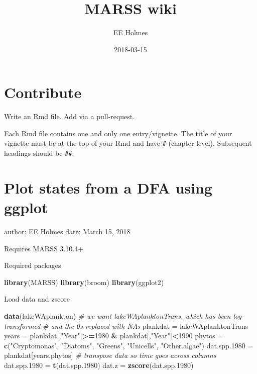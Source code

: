 \documentclass[]{book}
\title{MARSS wiki}
\author{EE Holmes}
\date{2018-03-15}
\newenvironment{Shaded}{\begin{snugshade}}{\end{snugshade}}
\newcommand{\KeywordTok}[1]{\textcolor[rgb]{0.13,0.29,0.53}{\textbf{#1}}}
\newcommand{\DecValTok}[1]{\textcolor[rgb]{0.00,0.00,0.81}{#1}}
\newcommand{\StringTok}[1]{\textcolor[rgb]{0.31,0.60,0.02}{#1}}
\newcommand{\CommentTok}[1]{\textcolor[rgb]{0.56,0.35,0.01}{\textit{#1}}}
\newcommand{\OperatorTok}[1]{\textcolor[rgb]{0.81,0.36,0.00}{\textbf{#1}}}
\newcommand{\NormalTok}[1]{#1}
\begin{document}
\maketitle

{
\setcounter{tocdepth}{1}
\tableofcontents
}
\newcommand{\var}{\mathrm{Var}}

\chapter{Contribute}\label{contribute}

Write an Rmd file. Add via a pull-request.

Each Rmd file contains one and only one entry/vignette. The title of
your vignette must be at the top of your Rmd and have \texttt{\#}
(chapter level). Subsequent headings should be \texttt{\#\#}.

\chapter{Plot states from a DFA using
ggplot}\label{plot-states-from-a-dfa-using-ggplot}

author: EE Holmes date: March 15, 2018

Requires MARSS 3.10.4+

Required packages

\begin{Shaded}
\begin{Highlighting}[]
\KeywordTok{library}\NormalTok{(MARSS)}
\KeywordTok{library}\NormalTok{(broom)}
\KeywordTok{library}\NormalTok{(ggplot2)}
\end{Highlighting}
\end{Shaded}

Load data and zscore

\begin{Shaded}
\begin{Highlighting}[]
\KeywordTok{data}\NormalTok{(lakeWAplankton)}
\CommentTok{# we want lakeWAplanktonTrans, which has been log-transformed}
\CommentTok{# and the 0s replaced with NAs}
\NormalTok{plankdat =}\StringTok{ }\NormalTok{lakeWAplanktonTrans}
\NormalTok{years =}\StringTok{ }\NormalTok{plankdat[,}\StringTok{"Year"}\NormalTok{]}\OperatorTok{>=}\DecValTok{1980} \OperatorTok{&}\StringTok{ }\NormalTok{plankdat[,}\StringTok{"Year"}\NormalTok{]}\OperatorTok{<}\DecValTok{1990}
\NormalTok{phytos =}\StringTok{ }\KeywordTok{c}\NormalTok{(}\StringTok{"Cryptomonas"}\NormalTok{, }\StringTok{"Diatoms"}\NormalTok{, }\StringTok{"Greens"}\NormalTok{,}
                  \StringTok{"Unicells"}\NormalTok{, }\StringTok{"Other.algae"}\NormalTok{)}
\NormalTok{dat.spp.}\DecValTok{1980}\NormalTok{ =}\StringTok{ }\NormalTok{plankdat[years,phytos]}
\CommentTok{# transpose data so time goes across columns}
\NormalTok{dat.spp.}\DecValTok{1980}\NormalTok{ =}\StringTok{ }\KeywordTok{t}\NormalTok{(dat.spp.}\DecValTok{1980}\NormalTok{)}
\NormalTok{dat.z =}\StringTok{ }\KeywordTok{zscore}\NormalTok{(dat.spp.}\DecValTok{1980}\NormalTok{)}
\end{Highlighting}
\end{Shaded}
\end{document}

